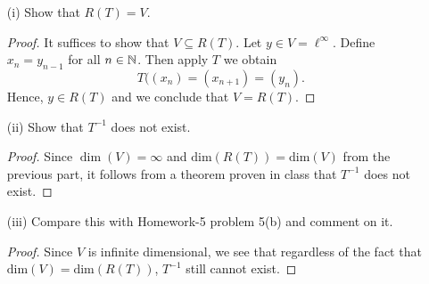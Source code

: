 \documentclass[a4paper]{article}
\begin{document}
\begin{enumerate}
        \begin{enumerate}
            \item[(i)] Show that \( R(T) = V  \).
                \begin{proof}
                It suffices to show that \( V \subseteq R(T) \). Let \( y \in V = \ell^{\infty } \). Define \( {x}_{n} = {y}_{n-1} \) for all \( n \in \mathbb{N} \). Then apply \( T  \) we obtain
                \[  T(({x}_{n}) = ({x}_{n+1}) =  ({y}_{n}). \]
                Hence, \( y \in R(T) \) and we conclude that \( V = R(T) \).
                \end{proof}
            \item[(ii)] Show that \( T^{-1}  \) does not exist.
                \begin{proof}
                Since \( \dim(V) = \infty  \) and \( \text{dim}(R(T)) = \text{dim}(V) \) from the previous part, it follows from a theorem proven in class that \( T^{-1} \) does not exist.
                \end{proof}
            \item[(iii)] Compare this with Homework-5 problem 5(b) and comment on it.
                \begin{proof}
                Since \( V  \) is infinite dimensional, we see that regardless of the fact that \( \text{dim}(V) = \text{dim}(R(T)) \), \( T^{-1} \) still cannot exist.
                \end{proof}
        \end{enumerate}
\end{enumerate}
\end{document}
